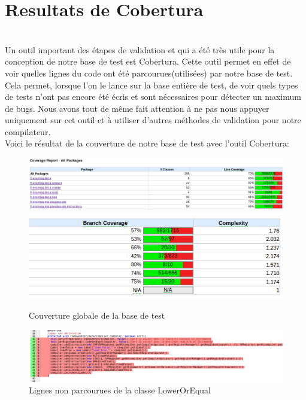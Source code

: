 \documentclass{article}
\begin{document}
\section{Resultats de Cobertura}
\\
Un outil important des étapes de validation et qui a été très utile pour la conception de notre base de test est Cobertura. Cette outil permet en effet de voir quelles lignes du code ont été parcourues(utilisées) par
notre base de test. Cela permet, lorsque l'on le lance sur la base entière de test, de voir quels types de tests n'ont pas encore été écris et sont nécessaires pour détecter un maximum de bugs. Nous avons
tout de même fait attention à ne pas nous appuyer uniquement sur cet outil et à utiliser d'autres méthodes de validation pour notre compilateur.
\\
Voici le résultat de la couverture de notre base de test avec l'outil Cobertura:

\begin{figure}[!h]
  \centering
  \includegraphics[scale=0.5]{screensCobertura/screenAll1.png}
  \includegraphics[scale=0.5]{screensCobertura/screenAll2.png}
  \caption{Couverture globale de la base de test}
\end{figure}



\begin{figure}[!h]
  \centering
  \includegraphics[scale=0.4]{screensCobertura/screenLowerOrEqual.png}
  \caption{Lignes non parcourues de la classe LowerOrEqual}
\end{figure}
\newpage
\end{document}
